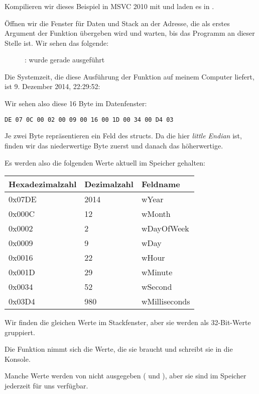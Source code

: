 \clearpage
\subsubsection{\olly}
\myindex{\olly}
Kompilieren wir dieses Beispiel in MSVC 2010 mit  und laden es in \olly.

Öffnen wir die Fenster für Daten und Stack an der Adresse, die als erstes Argument der Funktion 
übergeben wird und warten, bis das Programm an dieser Stelle ist. Wir sehen das folgende:

\begin{figure}[H]
\centering
{}
\caption{\olly:  wurde gerade ausgeführt}
\label{fig:struct_olly_1}
\end{figure}
Die Systemzeit, die diese Ausführung der Funktion auf meinem Computer liefert, ist 9. Dezember 2014, 22:29:52:


Wir sehen also diese 16 Byte im Datenfenster:
 
\begin{lstlisting}
DE 07 0C 00 02 00 09 00 16 00 1D 00 34 00 D4 03
\end{lstlisting}
Je zwei Byte repräsentieren ein Feld des structs. 
Da die  hier \emph{little Endian} ist, finden wir das niederwertige Byte zuerst und danach das
höherwertige.

Es werden also die folgenden Werte aktuell im Speicher gehalten:

\begin{center}
\begin{tabular}{ | l | l | l | }
\hline
\headercolor{} Hexadezimalzahl & 
\headercolor{} Dezimalzahl & 
\headercolor{} Feldname \\
\hline
0x07DE & 2014	& wYear \\
\hline
0x000C & 12	& wMonth \\
\hline
0x0002 & 2	& wDayOfWeek \\
\hline
0x0009 & 9	& wDay \\
\hline
0x0016 & 22	& wHour \\
\hline
0x001D & 29	& wMinute \\
\hline
0x0034 & 52	& wSecond \\
\hline	
0x03D4 & 980	& wMilliseconds \\
\hline
\end{tabular}
\end{center}
Wir finden die gleichen Werte im Stackfenster, aber sie werden als 32-Bit-Werte gruppiert.

Die Funktion \printf nimmt sich die Werte, die sie braucht und schreibt sie in die Konsole.

Manche Werte werden von \printf nicht ausgegeben ( und ), aber sie sind im Speicher
jederzeit für uns verfügbar.
